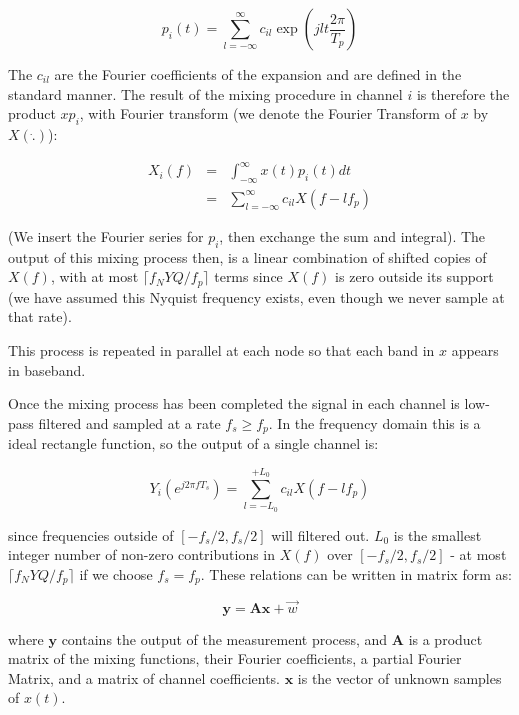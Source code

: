 \documentclass[conference]{IEEEtran}
\begin{document}
\begin{equation}
p_i\left(t\right) = \sum_{l=-\infty}^{\infty} c_{il} \exp\left({jlt\frac{2\pi}{T_p}}\right)
\end{equation}

The \(c_{il}\) are the Fourier coefficients of the expansion and are defined in the standard manner. The result of the mixing procedure in channel \(i\) is therefore the product \(xp_i\), with Fourier transform (we denote the Fourier Transform of \(x\) by \(X\left( \dot{.} \right)\)):

\begin{align}
X_{i}\left(f\right) &=& \int_{-\infty}^{\infty} x\left(t\right) p_i\left(t\right) dt \nonumber
\\ &=& \sum_{l=-\infty}^{\infty} c_{il} X\left(f-lf_p\right)
\end{align}

(We insert the Fourier series for \(p_i\), then exchange the sum and integral). The output of this mixing process then, is a linear combination of shifted copies of \(X\left(f\right)\), with at most \(\lceil f_NYQ/f_p\rceil\) terms since \(X\left(f\right)\) is zero outside its support (we have assumed this Nyquist frequency exists, even though we never sample at that rate).

This process is repeated in parallel at each node so that each band in \(x\) appears in baseband.

Once the mixing process has been completed the signal in each channel is low-pass filtered and sampled at a rate \(f_s \geq f_p\). In the frequency domain this is a ideal rectangle function, so the output of a single channel is:

\begin{equation}
Y_i\left(e^{j 2 \pi f T_s }\right) = \sum_{l = -L_0}^{+L_0} c_{il} X\left(f-lf_p\right)
\end{equation}

since frequencies outside of \([-f_s/2, f_s/2]\) will filtered out. \(L_0\) is the smallest integer number of non-zero contributions in \(X\left(f\right)\) over \([-f_s/2, f_s/2]\) - at most \(\lceil f_NYQ/f_p\rceil\) if we choose \(f_s = f_p\). These relations can be written in matrix form as:

\begin{equation}
\textbf{y} = \textbf{A}\textbf{x} + \vec{w}
\label{system}
\end{equation}

where \(\textbf{y}\) contains the output of the measurement process, and \(\textbf{A}\) is a product matrix of the mixing functions, their Fourier coefficients, a partial Fourier Matrix, and a matrix of channel coefficients. \(\textbf{x}\) is the vector of unknown samples of \(x\left(t\right)\). 
\end{document}
